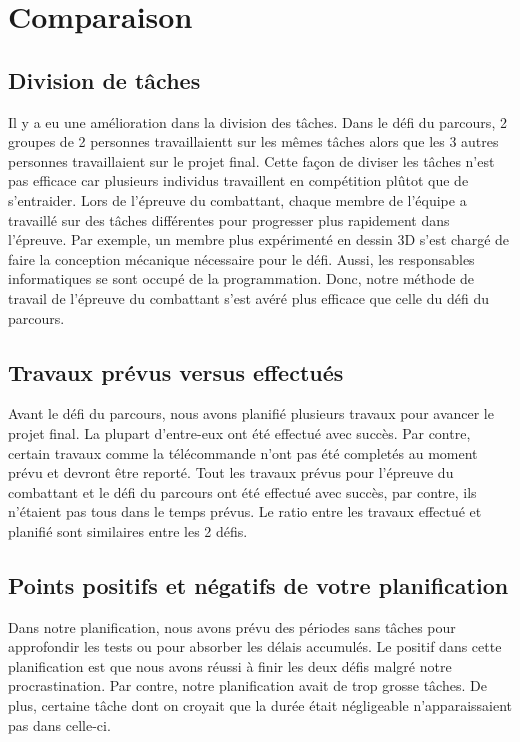 \section{Comparaison}


\subsection{Division de tâches}

Il y a eu une amélioration dans la division des tâches. Dans le défi du parcours, 2 groupes de 2 personnes travaillaientt sur les mêmes tâches alors que les 3 autres personnes travaillaient sur le projet final. Cette façon de diviser les tâches n'est pas efficace car plusieurs individus travaillent en compétition plûtot que de s'entraider. Lors de l'épreuve du combattant, chaque membre de l'équipe a travaillé sur des tâches différentes pour progresser plus rapidement dans l'épreuve. Par exemple, un membre plus expérimenté en dessin 3D s'est chargé de faire la conception mécanique nécessaire pour le défi. Aussi, les responsables informatiques se sont occupé de la programmation.  Donc, notre méthode de travail de l'épreuve du combattant s'est avéré plus efficace que celle du défi du parcours.

\subsection{Travaux prévus versus effectués}

Avant le défi du parcours, nous avons planifié plusieurs travaux pour avancer le projet final. La plupart d'entre-eux ont été effectué avec succès. Par contre, certain travaux comme la télécommande n'ont pas été completés au moment prévu et devront être reporté. Tout les travaux prévus pour l'épreuve du combattant et le défi du parcours ont été effectué avec succès, par contre, ils n'étaient pas tous dans le temps prévus. Le ratio entre les travaux effectué et planifié sont similaires entre les 2 défis.

\subsection{Points positifs et négatifs de votre planification}

Dans notre planification, nous avons prévu des périodes sans tâches pour approfondir les tests ou pour absorber les délais accumulés. Le positif dans cette planification est que nous avons réussi à finir les deux défis malgré notre procrastination. Par contre, notre planification avait de trop grosse tâches. De plus, certaine tâche dont on croyait que la durée était négligeable n'apparaissaient pas dans celle-ci.

